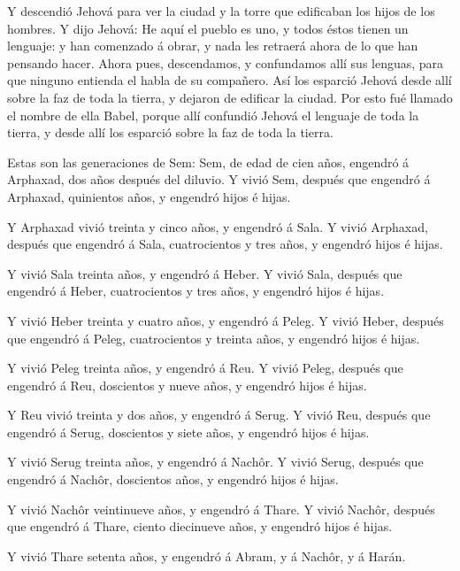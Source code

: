  Y descendió Jehová para ver la ciudad y la torre que
edificaban los hijos de los hombres.  Y dijo Jehová: He aquí
el pueblo es uno, y todos éstos tienen un lenguaje: y han comenzado á
obrar, y nada les retraerá ahora de lo que han pensando hacer.
 Ahora pues, descendamos, y confundamos allí sus lenguas,
para que ninguno entienda el habla de su compañero.  Así los
esparció Jehová desde allí sobre la faz de toda la tierra, y dejaron de
edificar la ciudad.  Por esto fué llamado el nombre de ella
Babel, porque allí confundió Jehová el lenguaje de toda la tierra, y
desde allí los esparció sobre la faz de toda la tierra.

 Estas son las generaciones de Sem: Sem, de edad de cien
años, engendró á Arphaxad, dos años después del diluvio.  Y
vivió Sem, después que engendró á Arphaxad, quinientos años, y engendró
hijos é hijas.

 Y Arphaxad vivió treinta y cinco años, y engendró á Sala.
 Y vivió Arphaxad, después que engendró á Sala,
cuatrocientos y tres años, y engendró hijos é hijas.

 Y vivió Sala treinta años, y engendró á Heber.
 Y vivió Sala, después que engendró á Heber, cuatrocientos
y tres años, y engendró hijos é hijas.

 Y vivió Heber treinta y cuatro años, y engendró á Peleg.
 Y vivió Heber, después que engendró á Peleg, cuatrocientos
y treinta años, y engendró hijos é hijas.

 Y vivió Peleg treinta años, y engendró á Reu.
 Y vivió Peleg, después que engendró á Reu, doscientos y
nueve años, y engendró hijos é hijas.

 Y Reu vivió treinta y dos años, y engendró á Serug.
 Y vivió Reu, después que engendró á Serug, doscientos y
siete años, y engendró hijos é hijas.

 Y vivió Serug treinta años, y engendró á Nachôr.
 Y vivió Serug, después que engendró á Nachôr, doscientos
años, y engendró hijos é hijas.

 Y vivió Nachôr veintinueve años, y engendró á Thare.
 Y vivió Nachôr, después que engendró á Thare, ciento
diecinueve años, y engendró hijos é hijas.

 Y vivió Thare setenta años, y engendró á Abram, y á
Nachôr, y á Harán.

